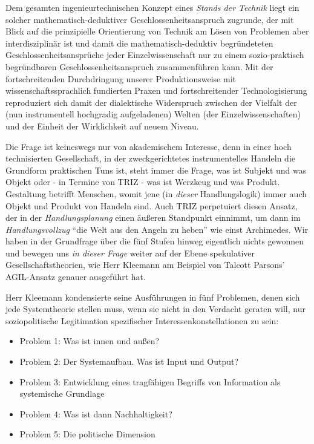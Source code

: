 \documentclass[11pt,a4paper]{article}
\begin{document}
Dem gesamten ingenieurtechnischen Konzept eines \emph{Stands der
Technik} liegt ein solcher mathematisch-deduktiver
Geschlossenheitsanspruch zugrunde, der mit Blick auf die prinzipielle
Orientierung von Technik am Lösen von Problemen aber interdisziplinär
ist und damit die mathematisch-deduktiv begründeteten
Geschlossenheitsansprüche jeder Einzelwissenschaft nur zu einem
sozio-praktisch begründbaren Geschlossenheitsanspruch zusammenführen
kann. Mit der fortschreitenden Durchdringung unserer Produktionsweise
mit wissenschaftssprachlich fundierten Praxen und fortschreitender
Technologisierung reproduziert sich damit der dialektische Widerspruch
zwischen der Vielfalt der (nun instrumentell hochgradig aufgeladenen)
Welten (der Einzelwissenschaften) und der Einheit der Wirklichkeit auf
neuem Niveau.

Die Frage ist keineswegs nur von akademischem Interesse, denn in einer
hoch technisierten Gesellschaft, in der zweckgerichtetes instrumentelles
Handeln die Grundform praktischen Tuns ist, steht immer die Frage, was
ist Subjekt und was Objekt oder - in Termine von TRIZ - was ist Werzkeug
und was Produkt. Gestaltung betrifft Menschen, womit jene (in
\emph{dieser} Handlungslogik) immer auch Objekt und Produkt von Handeln
sind. Auch TRIZ perpetuiert diesen Ansatz, der in der
\emph{Handlungsplanung} einen äußeren Standpunkt einnimmt, um dann im
\emph{Handlungsvollzug} ``die Welt aus den Angeln zu heben'' wie einst
Archimedes. Wir haben in der Grundfrage über die fünf Stufen hinweg
eigentlich nichts gewonnen und bewegen uns \emph{in dieser Frage} weiter
auf der Ebene spekulativer Gesellschaftstheorien, wie Herr Kleemann am
Beispiel von Talcott Parsons' AGIL-Ansatz genauer ausgeführt hat.

Herr Kleemann kondensierte seine Ausführungen in fünf Problemen, denen
sich jede Systemtheorie stellen muss, wenn sie nicht in den Verdacht
geraten will, nur soziopolitische Legitimation spezifischer
Interessenkonstellationen zu sein:

\begin{itemize}
[noitemsep]
\item
  Problem 1: Was ist innen und außen?
\item
  Problem 2: Der Systemaufbau. Was ist Input und Output?
\item
  Problem 3: Entwicklung eines tragfähigen Begriffs von Information als
  systemische Grundlage
\item
  Problem 4: Was ist dann Nachhaltigkeit?
\item
  Problem 5: Die politische Dimension
\end{itemize}
\end{document}
